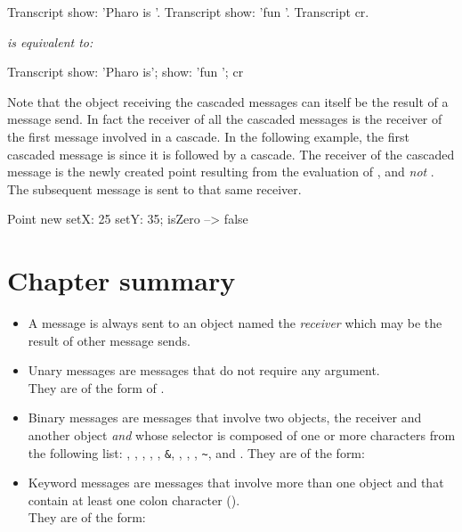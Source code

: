 \documentclass[a4paper,10pt,twoside]{book}
\begin{document}
{\begin{minipage}{0.35\textwidth}
\begin{code}{}
Transcript show: 'Pharo is '.
Transcript show: 'fun '.
Transcript cr.
\end{code}
\end{minipage}
\emph{is equivalent to:}
\begin{minipage}{0.35\textwidth}
\begin{code}{}
Transcript        
   show: 'Pharo is';
   show: 'fun ';
   cr
\end{code}
\end{minipage}

Note that the object receiving the cascaded messages can itself be the result of a message send. 
In fact the receiver of all the cascaded messages is the receiver of the first message involved in a cascade. In the following example, the first cascaded message is  since it is followed by a cascade. The receiver of the cascaded message  is the newly created point resulting from the evaluation of , and \emph{not} . The subsequent message  is sent to that same receiver. 

\begin{code}{}
Point new setX: 25 setY: 35; isZero --> false
\end{code}

\section{Chapter summary}

\begin{itemize}
\item A message is always sent to an object named the \emph{receiver} which may be the result of other message sends.

\item Unary messages are messages that do not require any argument.\\
They are of the form of .

\item Binary messages are messages that involve two objects, the receiver and another object \emph{and} whose selector is composed of  one or more characters from the following list: \ct{+}, \ct{-}, \ct{*}, \ct{/}, \ct{|}, \texttt{\&}, \ct{=}, \ct{>}, \ct{<}, \texttt{\~}, and .
They are of the form: 
\item Keyword messages are messages that involve more than one object and that contain at least one colon character (\ct{:}). \\
They are of the form:


\end{itemize}}
\end{document}
